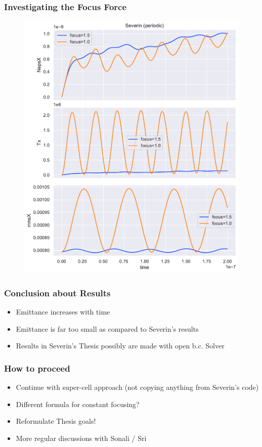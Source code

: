 \documentclass[.08pt,aspectratio=169]{beamer}
\begin{document}
\begin{frame}
    \frametitle{Investigating the Focus Force}

\begin{figure}[!htb]
%
  \includegraphics[width=1.1\linewidth]{figures/focus_comparison.pdf}
  \label{fig:awesome_image3}
\endminipage
\end{figure}

\end{frame}

\begin{frame}
    \frametitle{Conclusion about Results}

\begin{itemize}[label=$\bullet$]
    \item Emittance increases with time
	\item Emittance is far too small as compared to Severin's results
    \item Results in Severin's Thesis possibly are made with open b.c. Solver
\end{itemize}

\end{frame}

\begin{frame}
    \frametitle{How to proceed}

\begin{itemize}[label=$\bullet$]
    \item Continue with super-cell approach (not copying anything from Severin's code)
	\item Different formula for constant focusing?
    \item Reformulate Thesis goals!
	\item More regular discussions with Sonali / Sri
\end{itemize}

\end{frame}
\end{document}
